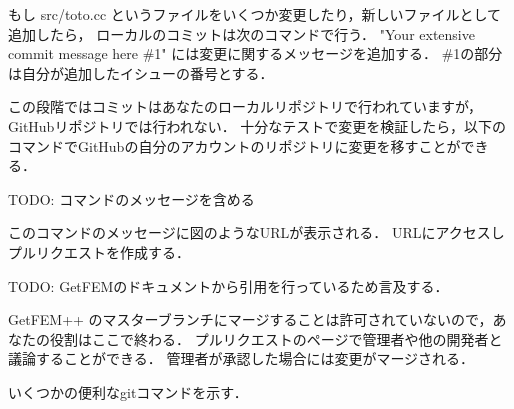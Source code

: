 \documentclass{ltjoc}
\begin{document}
\begin{shbox}
  \shuser{}
\end{shbox}

もし src/toto.cc というファイルをいくつか変更したり，新しいファイルとして追加したら，
ローカルのコミットは次のコマンドで行う．
"Your extensive commit message here \#1" には変更に関するメッセージを追加する．
\#1の部分は自分が追加したイシューの番号とする．

\begin{shbox}
  \shuser{}
\end{shbox}

この段階ではコミットはあなたのローカルリポジトリで行われていますが，GitHubリポジトリでは行われない．
十分なテストで変更を検証したら，以下のコマンドでGitHubの自分のアカウントのリポジトリに変更を移すことができる．

\begin{shbox}
  \shuser{}
\end{shbox}

TODO: コマンドのメッセージを含める

このコマンドのメッセージに図のようなURLが表示される．
URLにアクセスしプルリクエストを作成する．

TODO: GetFEMのドキュメントから引用を行っているため言及する．

GetFEM++ のマスターブランチにマージすることは許可されていないので，あなたの役割はここで終わる．
プルリクエストのページで管理者や他の開発者と議論することができる．
管理者が承認した場合には変更がマージされる．

いくつかの便利なgitコマンドを示す．

\begin{shbox}
  \shuser{}
\end{shbox}
\end{document}
